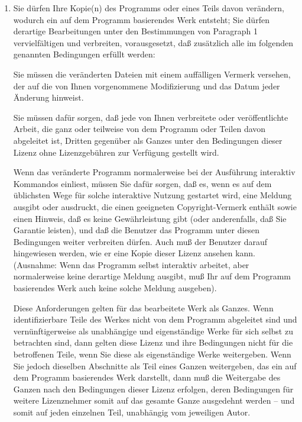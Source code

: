 {\begin{enumerate}
Sie dürfen für den physikalischen Vorgang des Zugänglichmachens einer Kopie eine Gebühr verlangen. Wenn Sie es wünschen, dürfen Sie auch gegen Entgelt eine Garantie für das Programm anbieten.

\item Sie dürfen Ihre Kopie(n) des Programms oder eines Teils davon verändern, wodurch ein auf dem Programm basierendes Werk entsteht; Sie dürfen derartige Bearbeitungen unter den Bestimmungen von Paragraph 1 vervielfältigen und verbreiten, vorausgesetzt, daß zusätzlich alle im folgenden genannten Bedingungen erfüllt werden:

    Sie müssen die veränderten Dateien mit einem auffälligen Vermerk versehen, der auf die von Ihnen vorgenommene Modifizierung und das Datum jeder Änderung hinweist.

    Sie müssen dafür sorgen, daß jede von Ihnen verbreitete oder veröffentlichte Arbeit, die ganz oder teilweise von dem Programm oder Teilen davon abgeleitet ist, Dritten gegenüber als Ganzes unter den Bedingungen dieser Lizenz ohne Lizenzgebühren zur Verfügung gestellt wird.

    Wenn das veränderte Programm normalerweise bei der Ausführung interaktiv Kommandos einliest, müssen Sie dafür sorgen, daß es, wenn es auf dem üblichsten Wege für solche interaktive Nutzung gestartet wird, eine Meldung ausgibt oder ausdruckt, die einen geeigneten Copyright-Vermerk enthält sowie einen Hinweis, daß es keine Gewährleistung gibt (oder anderenfalls, daß Sie Garantie leisten), und daß die Benutzer das Programm unter diesen Bedingungen weiter verbreiten dürfen. Auch muß der Benutzer darauf hingewiesen werden, wie er eine Kopie dieser Lizenz ansehen kann. (Ausnahme: Wenn das Programm selbst interaktiv arbeitet, aber normalerweise keine derartige Meldung ausgibt, muß Ihr auf dem Programm basierendes Werk auch keine solche Meldung ausgeben).

Diese Anforderungen gelten für das bearbeitete Werk als Ganzes. Wenn identifizierbare Teile des Werkes nicht von dem Programm abgeleitet sind und vernünftigerweise als unabhängige und eigenständige Werke für sich selbst zu betrachten sind, dann gelten diese Lizenz und ihre Bedingungen nicht für die betroffenen Teile, wenn Sie diese als eigenständige Werke weitergeben. Wenn Sie jedoch dieselben Abschnitte als Teil eines Ganzen weitergeben, das ein auf dem Programm basierendes Werk darstellt, dann muß die Weitergabe des Ganzen nach den Bedingungen dieser Lizenz erfolgen, deren Bedingungen für weitere Lizenznehmer somit auf das gesamte Ganze ausgedehnt werden – und somit auf jeden einzelnen Teil, unabhängig vom jeweiligen Autor.


\end{enumerate}}
